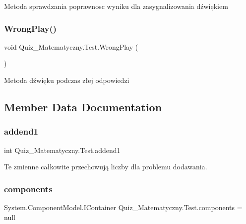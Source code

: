 Metoda sprawdzania poprawnosc wyniku dla zasygnalizowania dźwiękiem \mbox{\label{class_quiz___matematyczny_1_1_test_a20f5bb5d06fca2ad7dee6a7c454ddb6e}} 
\subsubsection{\texorpdfstring{WrongPlay()}{WrongPlay()}}
{\footnotesize\ttfamily void Quiz\+\_\+\+Matematyczny.\+Test.\+Wrong\+Play (\begin{DoxyParamCaption}{ }\end{DoxyParamCaption})\hspace{0.3cm}{\ttfamily [private]}}

Metoda dźwięku podczas złej odpowiedzi 

\subsection{Member Data Documentation}
\mbox{\label{class_quiz___matematyczny_1_1_test_ae376176ce77896444b1433b0c89e9115}} 
\subsubsection{\texorpdfstring{addend1}{addend1}}
{\footnotesize\ttfamily int Quiz\+\_\+\+Matematyczny.\+Test.\+addend1\hspace{0.3cm}{\ttfamily [private]}}

Te zmienne całkowite przechowują liczby dla problemu dodawania. \mbox{\label{class_quiz___matematyczny_1_1_test_aea27eb0b6dcfbde28e3d708c241b865c}} 
\subsubsection{\texorpdfstring{components}{components}}
{\footnotesize\ttfamily System.\+Component\+Model.\+I\+Container Quiz\+\_\+\+Matematyczny.\+Test.\+components = null\hspace{0.3cm}{\ttfamily [private]}}



